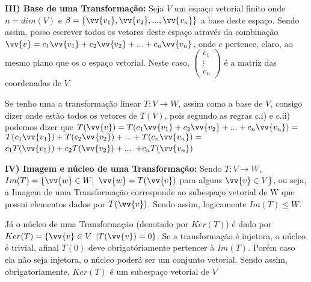 \documentclass[11pt,a4paper]{article}
\newcommand\tab[1][1.835cm]{\hspace*{#1}}
\newcommand\tabb[1][2.2cm]{\hspace*{#1}}
\begin{document}
\begin{flushleft}
\tab \textbf{III) Base de uma Transformação:} Seja $V$ um espaço vetorial finito onde $ n = dim(V)$ e $\beta = \{ \vv{v_1}, \vv{v_2}, ..., \vv{v_n} \}$ a base deste espaço. Sendo assim, posso escrever todos os vetores deste espaço através da combinação $\vv{v} = c_1\vv{v_1} + c_2\vv{v_2} + ... + c_n\vv{v_n}$, onde $c$ pertence, claro, ao mesmo plano que os o espaço vetorial.  Neste caso, $\begin{pmatrix} c_1 \\ \vdots \\ c_n \end{pmatrix}$ é a matriz das coordenadas de $V$.\linebreak

\tabb Se tenho uma a transformação linear $T: V \rightarrow W$, assim como a base de $V$, consigo dizer onde estão todos os vetores de $T(V)$, pois segundo as regras c.i) e c.ii) podemos dizer que $T(\vv{v})=T(c_1\vv{v_1}+c_2\vv{v_2}+...+c_n\vv{v_n})=$ $T(c_1\vv{v_1})+T(c_2\vv{v_2})+...+T(c_n\vv{v_n})= $ $c_1T(\vv{v_1})+c_2T(\vv{v_2})+...$ $ + c_nT(\vv{v_n})$ \linebreak

\tab \textbf{IV) Imagem e núcleo de uma Transformação:} Sendo $T: V \rightarrow W$, $Im(T) = \{ \vv{w} \in W | $ $ \vv{w} = T(\vv{v})$ para alguns $\vv{v} \in V\}$, ou seja, a Imagem de uma Transformação corresponde ao subespaço vetorial de W que possui elementos dados por $T(\vv{v})$. Sendo assim, logicamente $Im(T) \leq W$. \linebreak

\tab Já o núcleo de uma Transformação (denotado por $Ker(T)$) é dado por $Ker(T) = \{ \vv{v} \in V $ $ | T(\vv{v}) = 0\}$. Se a transformação é injetora, o núcleo é trivial, afinal $T(0)$ deve obrigatóriamente pertencer à $Im(T)$. Porém caso ela não seja injetora, o núcleo poderá ser um conjunto vetorial. Sendo assim, obrigatoriamente, $Ker(T)$ é um subespaço vetorial de $V$ \linebreak


\end{flushleft}
\end{document}
